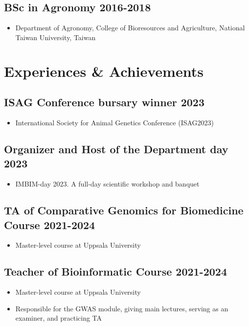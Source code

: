 \documentclass[10pt]{article}
\begin{document}
\subsection*{BSc in Agronomy \hfill 2016-2018}
\begin{itemize}
\item Department of Agronomy, College of Bioresources and Agriculture, National Taiwan University, Taiwan
\end{itemize}



\section*{Experiences \& Achievements}

\subsection*{ISAG Conference bursary winner \hfill 2023}
\begin{itemize}
\item International Society for Animal Genetics Conference (ISAG2023)
\end{itemize}

\subsection*{Organizer and Host of the Department day \hfill 2023}
\begin{itemize}
\item IMBIM-day 2023. A full-day scientific workshop and banquet
\end{itemize}

\subsection*{TA of Comparative Genomics for Biomedicine Course \hfill 2021-2024}
\begin{itemize}
\item Master-level course at Uppsala University
\end{itemize}

\subsection*{Teacher of Bioinformatic Course \hfill 2021-2024}
\begin{itemize}
\item Master-level course at Uppsala University
\item Responsible for the GWAS module, giving main lectures, serving as an examiner, and practicing TA
\end{itemize}
\end{document}
